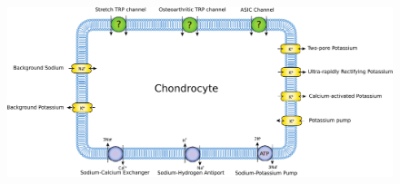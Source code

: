 \setlength{\textwidth}{18cm}
\setlength{\oddsidemargin}{0in}
\setlength{\evensidemargin}{0in}

\clearpage
\begin{landscape}
\begin{figure}
  \centering
  \includegraphics[width=\textwidth]
  {../images/pdf/chondrocyte-model-cellml}
  \caption{}
  \label{fig:chondrocyte-model}
\end{figure}
\end{landscape}

